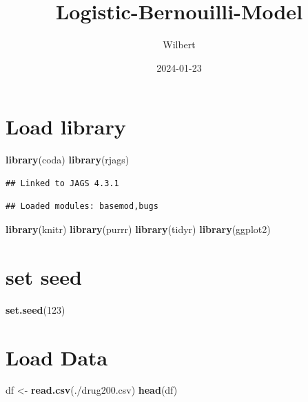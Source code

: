 \documentclass[
]{article}
\title{Logistic-Bernouilli-Model}
\author{Wilbert}
\date{2024-01-23}
\newenvironment{Shaded}{\begin{snugshade}}{\end{snugshade}}
\newcommand{\DecValTok}[1]{\textcolor[rgb]{0.00,0.00,0.81}{#1}}
\newcommand{\FunctionTok}[1]{\textcolor[rgb]{0.13,0.29,0.53}{\textbf{#1}}}
\newcommand{\NormalTok}[1]{#1}
\newcommand{\OtherTok}[1]{\textcolor[rgb]{0.56,0.35,0.01}{#1}}
\newcommand{\StringTok}[1]{\textcolor[rgb]{0.31,0.60,0.02}{#1}}
\begin{document}
\maketitle

\section{Load library}\label{load-library}

\begin{Shaded}
\begin{Highlighting}[]
\FunctionTok{library}\NormalTok{(coda)}
\FunctionTok{library}\NormalTok{(rjags)}
\end{Highlighting}
\end{Shaded}

\begin{verbatim}
## Linked to JAGS 4.3.1
\end{verbatim}

\begin{verbatim}
## Loaded modules: basemod,bugs
\end{verbatim}

\begin{Shaded}
\begin{Highlighting}[]
\FunctionTok{library}\NormalTok{(knitr)}
\FunctionTok{library}\NormalTok{(purrr)}
\FunctionTok{library}\NormalTok{(tidyr)}
\FunctionTok{library}\NormalTok{(ggplot2)}
\end{Highlighting}
\end{Shaded}

\section{set seed}\label{set-seed}

\begin{Shaded}
\begin{Highlighting}[]
\FunctionTok{set.seed}\NormalTok{(}\DecValTok{123}\NormalTok{)}
\end{Highlighting}
\end{Shaded}

\section{Load Data}\label{load-data}

\begin{Shaded}
\begin{Highlighting}[]
\NormalTok{df }\OtherTok{\textless{}{-}} \FunctionTok{read.csv}\NormalTok{(}\StringTok{\textquotesingle{}./drug200.csv\textquotesingle{}}\NormalTok{)}
\FunctionTok{head}\NormalTok{(df)}
\end{Highlighting}
\end{Shaded}
\end{document}
